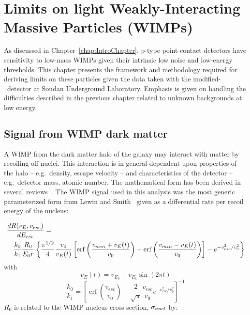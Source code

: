 

\chapter{Limits on light Weakly-Interacting Massive Particles (WIMPs)}
\label{chap:DMWIMPLimits}

	As discussed in Chapter~\ref{chap:IntroChapter}, p-type point-contact detectors have sensitivity to low-mass WIMPs given their intrinsic low noise and low-energy thresholds.  This chapter presents the framework and methodology required for deriving limits on these particles given the data taken with the modified-\bege~detector at Soudan Underground Laboratory.  Emphasis is given on handling the difficulties described in the previous chapter related to unknown backgrounds at low energy.  

	\section{Signal from WIMP dark matter}
	\label{sec:CalcLimitsOnWIMPSignal}	

	A WIMP from the dark matter halo of the galaxy may interact with matter by recoiling off nuclei.  This interaction is in general dependent upon properties of the halo -- e.g.~density, escape velocity -- and characteristics of the detector -- e.g.~detector mass, atomic number.  The mathematical form has been derived in several reviews~\cite{Lew96,Jun96}.  The WIMP signal used in this analysis was the most generic parameterized form from Lewin and Smith~\cite{Lew96} given as a differential rate per recoil energy of the nucleus:

		\begin{eqnarray}
			\begin{aligned}
			\lefteqn{\frac{dR (v_{E}, v_{esc})}{dE_{rec}} = } \\ 
				& & \frac{k_{0}}{k_{1}} \frac{R_{0}}{E_{0} r} 
				\left\{ 
			 		\frac{\pi^{1/2}}{4} \frac{v_{0}}{v_{E}(t)} 
					\left[ 
						\operatorname{erf} \left( \frac{v_{min} + v_{E}(t)}{v_{0}} \right) - 
							   \operatorname{erf} \left( \frac{v_{min} - v_{E}(t)}{v_{0}} \right) 
					\right] 
					- e^{-v_{esc}^{2}/v_{0}^{2}} 
				\right\}
			\label{eqn:WIMPMasterEqn}
			\end{aligned}
		\end{eqnarray}
with 
		\[
		v_{E}(t) = v_{E_{0}} + v_{E_{1}}\sin (2 \pi t)
		\]
		\[
		\frac{k_{0}}{k_{1}} = \left[
			\operatorname{erf} \left( \frac{v_{esc}}{v_{0}} \right ) - 
			\frac{2}{\sqrt{\pi}} \frac{v_{esc}}{v_{0}} e^{-v_{esc}^{2}/v_{0}^{2}}
		\right]^{-1}
		\]
$R_{0}$ is related to the WIMP-nucleus cross section, $\sigma_{nucl}$ by:

